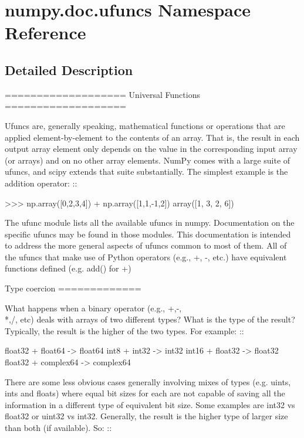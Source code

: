 \hypertarget{namespacenumpy_1_1doc_1_1ufuncs}{}\section{numpy.\+doc.\+ufuncs Namespace Reference}
\label{namespacenumpy_1_1doc_1_1ufuncs}


\subsection{Detailed Description}
\begin{DoxyVerb}===================
Universal Functions
===================

Ufuncs are, generally speaking, mathematical functions or operations that are
applied element-by-element to the contents of an array. That is, the result
in each output array element only depends on the value in the corresponding
input array (or arrays) and on no other array elements. NumPy comes with a
large suite of ufuncs, and scipy extends that suite substantially. The simplest
example is the addition operator: ::

 >>> np.array([0,2,3,4]) + np.array([1,1,-1,2])
 array([1, 3, 2, 6])

The ufunc module lists all the available ufuncs in numpy. Documentation on
the specific ufuncs may be found in those modules. This documentation is
intended to address the more general aspects of ufuncs common to most of
them. All of the ufuncs that make use of Python operators (e.g., +, -, etc.)
have equivalent functions defined (e.g. add() for +)

Type coercion
=============

What happens when a binary operator (e.g., +,-,\\*,/, etc) deals with arrays of
two different types? What is the type of the result? Typically, the result is
the higher of the two types. For example: ::

 float32 + float64 -> float64
 int8 + int32 -> int32
 int16 + float32 -> float32
 float32 + complex64 -> complex64

There are some less obvious cases generally involving mixes of types
(e.g. uints, ints and floats) where equal bit sizes for each are not
capable of saving all the information in a different type of equivalent
bit size. Some examples are int32 vs float32 or uint32 vs int32.
Generally, the result is the higher type of larger size than both
(if available). So: ::


\end{DoxyVerb}
